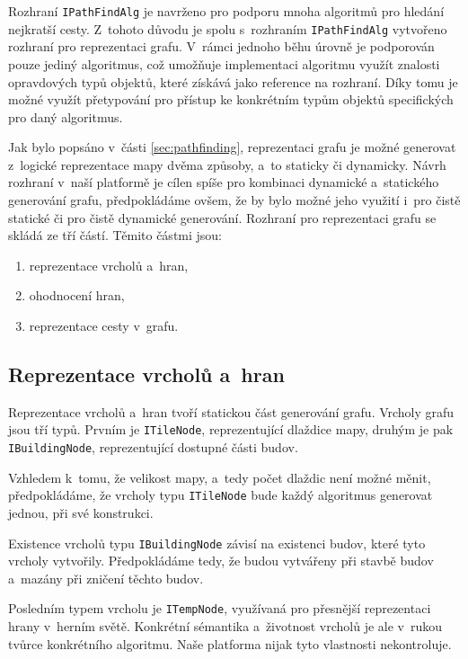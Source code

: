 Rozhraní \texttt{IPathFindAlg} je navrženo pro podporu mnoha algoritmů pro hledání nejkratší cesty. Z~tohoto důvodu je spolu s~rozhraním \texttt{IPathFindAlg} vytvořeno rozhraní pro reprezentaci grafu. V~rámci jednoho běhu úrovně je podporován pouze jediný algoritmus, což umožňuje implementaci algoritmu využít znalosti opravdových typů objektů, které získává jako reference na rozhraní. Díky tomu je možné využít přetypování pro přístup ke konkrétním typům objektů specifických pro daný algoritmus.

Jak bylo popsáno v~části \ref{sec:pathfinding}, reprezentaci grafu je možné generovat z~logické reprezentace mapy dvěma způsoby, a~to staticky či dynamicky. Návrh rozhraní v~naší platformě je cílen spíše pro kombinaci dynamické a~statického generování grafu, předpokládáme ovšem, že by bylo možné jeho využití i~pro čistě statické či pro čistě dynamické generování. Rozhraní pro reprezentaci grafu se skládá ze tří částí. Těmito částmi jsou:

\begin{enumerate}
	\item reprezentace vrcholů a~hran,
	\item ohodnocení hran,
	\item reprezentace cesty v~grafu.
\end{enumerate}

\subsection{Reprezentace vrcholů a~hran}
Reprezentace vrcholů a~hran tvoří statickou část generování grafu. Vrcholy grafu jsou tří typů. Prvním je \texttt{ITileNode}, reprezentující dlaždice mapy, druhým je pak \texttt{IBuildingNode}, reprezentující dostupné části budov.

Vzhledem k~tomu, že velikost mapy, a~tedy počet dlaždic není možné měnit, předpokládáme, že vrcholy typu \texttt{ITileNode} bude každý algoritmus generovat jednou, při své konstrukci. 

Existence vrcholů typu \texttt{IBuildingNode} závisí na existenci budov, které tyto vrcholy vytvořily. Předpokládáme tedy, že budou vytvářeny při stavbě budov a~mazány při zničení těchto budov. 

Posledním typem vrcholu je \texttt{ITempNode}, využívaná pro přesnější reprezentaci hrany v~herním světě. Konkrétní sémantika a~životnost vrcholů je ale v~rukou tvůrce konkrétního algoritmu. Naše platforma nijak tyto vlastnosti nekontroluje. 

